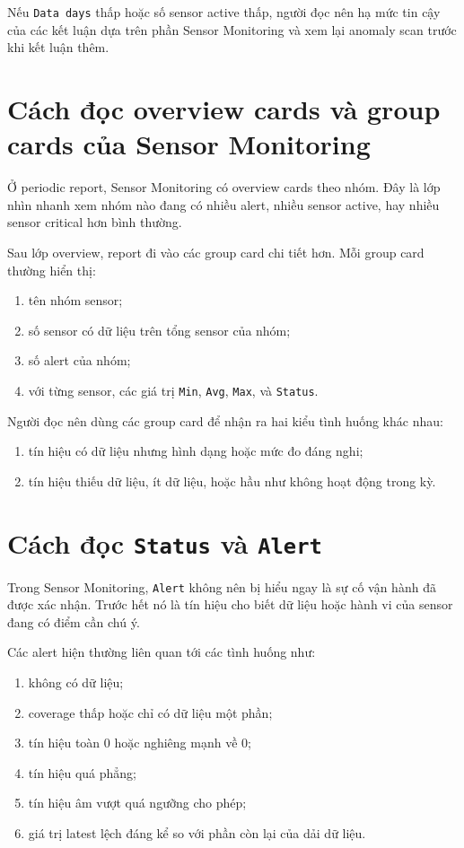Nếu \texttt{Data days} thấp hoặc số sensor active thấp, người đọc nên hạ mức tin cậy của các kết luận dựa trên phần Sensor Monitoring và xem lại anomaly scan trước khi kết luận thêm.

\section{Cách đọc overview cards và group cards của Sensor Monitoring}

Ở periodic report, Sensor Monitoring có overview cards theo nhóm. Đây là lớp nhìn nhanh xem nhóm nào đang có nhiều alert, nhiều sensor active, hay nhiều sensor critical hơn bình thường.

Sau lớp overview, report đi vào các group card chi tiết hơn. Mỗi group card thường hiển thị:

\begin{enumerate}[label=-]
\item tên nhóm sensor;
\item số sensor có dữ liệu trên tổng sensor của nhóm;
\item số alert của nhóm;
\item với từng sensor, các giá trị \texttt{Min}, \texttt{Avg}, \texttt{Max}, và \texttt{Status}.
\end{enumerate}

Người đọc nên dùng các group card để nhận ra hai kiểu tình huống khác nhau:

\begin{enumerate}[label=-]
\item tín hiệu có dữ liệu nhưng hình dạng hoặc mức đo đáng nghi;
\item tín hiệu thiếu dữ liệu, ít dữ liệu, hoặc hầu như không hoạt động trong kỳ.
\end{enumerate}

\section{Cách đọc \texttt{Status} và \texttt{Alert}}

Trong Sensor Monitoring, \texttt{Alert} không nên bị hiểu ngay là sự cố vận hành đã được xác nhận. Trước hết nó là tín hiệu cho biết dữ liệu hoặc hành vi của sensor đang có điểm cần chú ý.

Các alert hiện thường liên quan tới các tình huống như:

\begin{enumerate}[label=-]
\item không có dữ liệu;
\item coverage thấp hoặc chỉ có dữ liệu một phần;
\item tín hiệu toàn 0 hoặc nghiêng mạnh về 0;
\item tín hiệu quá phẳng;
\item tín hiệu âm vượt quá ngưỡng cho phép;
\item giá trị latest lệch đáng kể so với phần còn lại của dải dữ liệu.
\end{enumerate}

